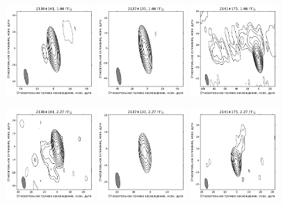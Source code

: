 \addtocounter{figure}{-1}
\begin{figure}
  \centering

  \includegraphics[width=0.3\textwidth]{2136+141_L.pdf}
  \includegraphics[width=0.3\textwidth]{2137+130_L.pdf}
  \includegraphics[width=0.3\textwidth]{2141+175_L.pdf}


  \includegraphics[width=0.3\textwidth]{2136+141_S.pdf}
  \includegraphics[width=0.3\textwidth]{2137+130_S.pdf}
  \includegraphics[width=0.3\textwidth]{2141+175_S.pdf}



\end{figure}
